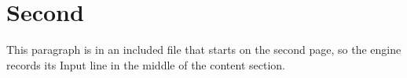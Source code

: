 \section{Second}

This paragraph is in an included file that starts on the second page, so the
engine records its Input line in the middle of the content section.

\lipsum[8-9]
